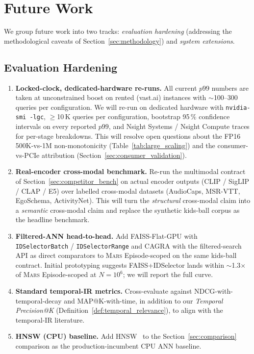 \documentclass[11pt]{article}
\newcommand{\mars}{\textsc{Mars}}
\begin{document}
\section{Future Work}
\label{sec:future-work}

We group future work into two tracks: \emph{evaluation hardening}
(addressing the methodological caveats of
Section~\ref{sec:methodology}) and \emph{system extensions}.

\subsection*{Evaluation Hardening}

\begin{enumerate}
\item \textbf{Locked-clock, dedicated-hardware re-runs.} All current
  $p99$ numbers are taken at unconstrained boost on rented
  (vast.ai) instances with $\sim$100--300 queries per configuration.
  We will re-run on dedicated hardware with
  \texttt{nvidia-smi -lgc}, $\geq$10\,K queries per configuration,
  bootstrap 95\,\% confidence intervals on every reported $p99$, and
  Nsight Systems / Nsight Compute traces for per-stage breakdowns.
  This will resolve open questions about the FP16 500K-vs-1M
  non-monotonicity (Table~\ref{tab:large_scaling}) and the consumer-vs-PCIe
  attribution (Section~\ref{sec:consumer_validation}).

\item \textbf{Real-encoder cross-modal benchmark.} Re-run the
  multimodal contract of Section~\ref{sec:competitor_bench} on actual
  encoder outputs (CLIP / SigLIP / CLAP / E5) over labelled
  cross-modal datasets (AudioCaps, MSR-VTT, EgoSchema, ActivityNet).
  This will turn the \emph{structural} cross-modal claim into a
  \emph{semantic} cross-modal claim and replace the synthetic
  kids-ball corpus as the headline benchmark.

\item \textbf{Filtered-ANN head-to-head.} Add FAISS-Flat-GPU with
  \texttt{IDSelectorBatch} / \texttt{IDSelectorRange} and CAGRA
  with the filtered-search API as direct comparators to \mars{}
  Episode-scoped on the same kids-ball contract. Initial prototyping
  suggests FAISS+IDSelector lands within $\sim$1.3$\times$ of
  \mars{} Episode-scoped at $N{=}10^6$; we will report the full
  curve.

\item \textbf{Standard temporal-IR metrics.} Cross-evaluate against
  NDCG-with-temporal-decay and MAP@K-with-time, in addition to our
  \emph{Temporal Precision@K} (Definition~\ref{def:temporal_relevance}),
  to align with the temporal-IR literature.

\item \textbf{HNSW (CPU) baseline.} Add HNSW~\cite{hnsw} to the
  Section~\ref{sec:comparison} comparison as the
  production-incumbent CPU ANN baseline.
\end{enumerate}
\end{document}
